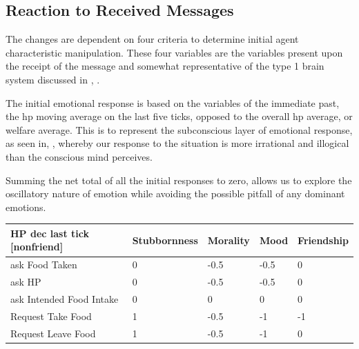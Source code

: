 \subsection{Reaction to Received Messages}
The changes are dependent on four criteria to determine initial agent characteristic manipulation. These four variables are the variables present upon the receipt of the message and somewhat representative of the type 1 brain system discussed in \cite{kahneman_tversky_2000}, \cite{frankish_2010}. \par
The initial emotional response is based on the variables of the immediate past, the hp moving average on the last five ticks, opposed to the overall hp average, or welfare average. This is to represent the subconscious layer of emotional response, as seen in, \cite{kamble_2021}, whereby our response to the situation is more irrational and illogical than the conscious mind perceives. \par
Summing the net total of all the initial responses to zero, allows us to explore the oscillatory nature of emotion while avoiding the possible pitfall of any dominant emotions. \par
\begin{table}[htb]
    \centering
    \begin{tabular}{@{}lllll@{}}
    \toprule
    HP dec last tick [nonfriend]    & Stubbornness      & Morality         & Mood             & Friendship     \\ \midrule
    ask Food Taken                  & 0                 & -0.5             & -0.5             & 0              \\
    ask HP                          & 0                 & -0.5             & -0.5             & 0              \\
    ask Intended Food Intake        & 0                 & 0                & 0                & 0              \\
    Request Take Food               & 1                 & -0.5             & -1               & -1             \\
    Request Leave Food              & 1                 & -0.5             & -1               & 0              \\ \bottomrule
    \end{tabular}
\end{table}

